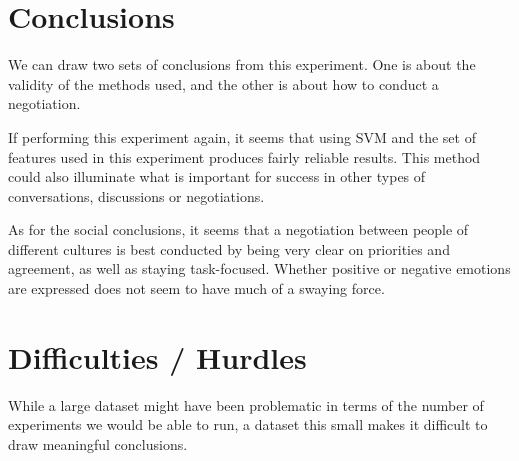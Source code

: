 \documentclass[11pt]{article} %
\begin{document}
\section{Conclusions}

We can draw two sets of conclusions from this experiment.  One is about the validity of the methods used, and the other is about how to conduct a negotiation.

If performing this experiment again, it seems that using SVM and the set of features used in this experiment produces fairly reliable results.  This method could also illuminate what is important for success in other types of conversations, discussions or negotiations.

As for the social conclusions, it seems that a negotiation between people of different cultures is best conducted by being very clear on priorities and agreement, as well as staying task-focused.  Whether positive or negative emotions are expressed does not seem to have much of a swaying force.

\section{Difficulties / Hurdles}

While a large dataset might have been problematic in terms of the number of experiments we would be able to run, a dataset this small makes it difficult to draw meaningful conclusions.



\end{document}
